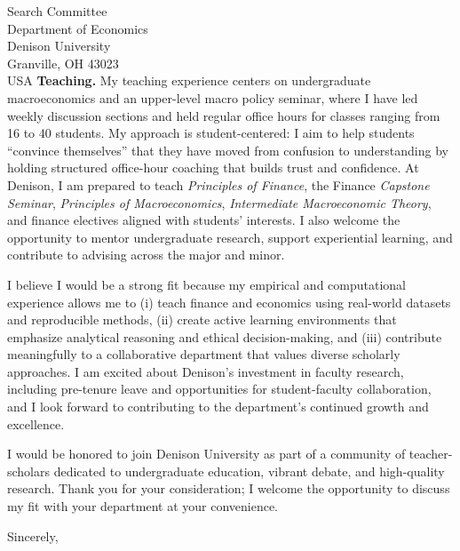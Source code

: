 \documentclass[11pt,letterpaper]{letter}
\begin{document}
\begin{letter}{Search Committee \\
Department of Economics \\
Denison University \\
Granville, OH 43023 \\ USA}
\textbf{Teaching.} My teaching experience centers on undergraduate macroeconomics and an upper-level macro policy seminar, where I have led weekly discussion sections and held regular office hours for classes ranging from 16 to 40 students. My approach is student-centered: I aim to help students “convince themselves” that they have moved from confusion to understanding by holding structured office-hour coaching that builds trust and confidence. At Denison, I am prepared to teach \textit{Principles of Finance}, the Finance \textit{Capstone Seminar}, \textit{Principles of Macroeconomics}, \textit{Intermediate Macroeconomic Theory}, and finance electives aligned with students’ interests. I also welcome the opportunity to mentor undergraduate research, support experiential learning, and contribute to advising across the major and minor.

I believe I would be a strong fit because my empirical and computational experience allows me to (i) teach finance and economics using real-world datasets and reproducible methods, (ii) create active learning environments that emphasize analytical reasoning and ethical decision-making, and (iii) contribute meaningfully to a collaborative department that values diverse scholarly approaches. I am excited about Denison’s investment in faculty research, including pre-tenure leave and opportunities for student-faculty collaboration, and I look forward to contributing to the department’s continued growth and excellence.

I would be honored to join Denison University as part of a community of teacher-scholars dedicated to undergraduate education, vibrant debate, and high-quality research. Thank you for your consideration; I welcome the opportunity to discuss my fit with your department at your convenience.

\closing{Sincerely,}

\end{letter}
\end{document}
